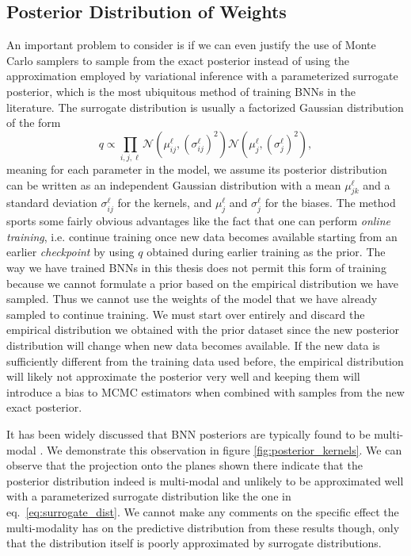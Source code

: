 \subsection{Posterior Distribution of Weights}
An important problem to consider is if we can even justify the use of Monte Carlo samplers to sample from the exact posterior instead of using the approximation employed by variational inference with a parameterized surrogate posterior, which is the most ubiquitous method of training BNNs in the literature. The surrogate distribution is usually a factorized Gaussian distribution of the form
\begin{equation}\label{eq:surrogate_dist}
    q \propto \prod_{i, j, \ell} \mathcal{N}(\mu_{ij}^\ell, (\sigma_{ij}^\ell)^2) \mathcal{N}(\mu_{j}^\ell, (\sigma_{j}^\ell)^2),
\end{equation}
meaning for each parameter in the model, we assume its posterior distribution can be written as an independent Gaussian distribution with a mean $\mu_{jk}^\ell$ and a standard deviation $\sigma_{ij}^\ell$ for the kernels, and $\mu_j^\ell$ and $\sigma_j^\ell$ for the biases. The method sports some fairly obvious advantages like the fact that one can perform \textit{online training}, i.e. continue training once new data becomes available starting from an earlier \textit{checkpoint} by using $q$ obtained during earlier training as the prior. The way we have trained BNNs in this thesis does not permit this form of training because we cannot formulate a prior based on the empirical distribution we have sampled. Thus we cannot use the weights of the model that we have already sampled to continue training. We must start over entirely and discard the empirical distribution we obtained with the prior dataset since the new posterior distribution will change when new data becomes available. If the new data is sufficiently different from the training data used before, the empirical distribution will likely not approximate the posterior very well and keeping them will introduce a bias to MCMC estimators when combined with samples from the new exact posterior.

It has been widely discussed that BNN posteriors are typically found to be multi-modal \cite{google_bnn_posteriors}. We demonstrate this observation in figure \ref{fig:posterior_kernels}.
We can observe that the projection onto the planes shown there indicate that the posterior distribution indeed is multi-modal
and unlikely to be approximated well with a parameterized surrogate distribution like the one in eq.~\eqref{eq:surrogate_dist}. We cannot make any comments on the specific effect the multi-modality has on the predictive distribution from these results though, only that the distribution itself is poorly approximated by surrogate distributions.

